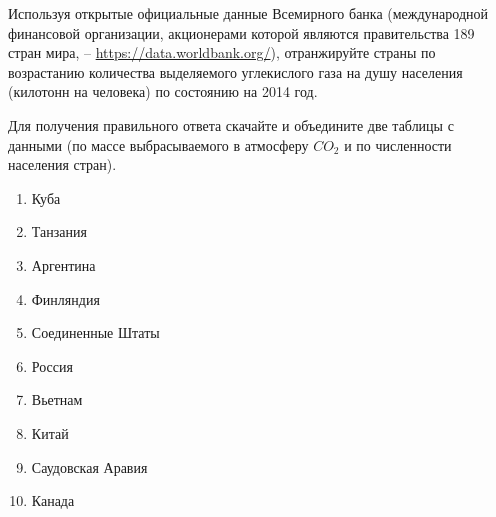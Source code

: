 
Используя открытые официальные данные Всемирного банка (международной финансовой организации, акционерами которой являются правительства 
189 стран мира, – \url{https://data.worldbank.org/}),  отранжируйте страны по возрастанию количества выделяемого углекислого газа на душу 
населения (килотонн на человека) по состоянию на 2014 год.

Для получения правильного ответа скачайте и объедините две таблицы с данными (по массе выбрасываемого в атмосферу $CO_2$ и по численности 
населения стран).

\begin{enumerate}
    \item Куба
    \item Танзания
    \item Аргентина
    \item Финляндия
    \item Соединенные Штаты
    \item Россия
    \item Вьетнам
    \item Китай
    \item Саудовская Аравия
    \item Канада
\end{enumerate}

\soultionSection

